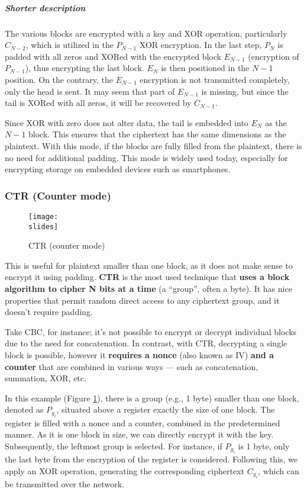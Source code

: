 \subparagraph{Shorter description}
The various blocks are encrypted with a key and XOR operation, particularly \(C_{N-2}\), which is utilized in the \(P_{N-1}\) XOR encryption.
In the last step, \(P_N\) is padded with all zeros and XORed with the encrypted block \(E_{N-1}\) (encryption of \( P_{N-1} \)), thus encrypting the last block.
\(E_N\) is then positioned in the \(N-1\) position. On the contrary, the \(E_{N-1}\) encryption is not transmitted completely, only the head is sent. It may seem that part of \(E_{N-1}\) is missing, but since the tail is XORed with all zeros, it will be recovered by \(C_{N-1}\).

Since XOR with zero does not alter data, the tail is embedded into \(E_N\) as the \(N-1\) block. This ensures that the ciphertext has the same dimensions as the plaintext. With this mode, if the blocks are fully filled from the plaintext, there is no need for additional padding. This mode is widely used today, especially for encrypting storage on embedded devices such as smartphones.


\subsubsection{CTR (Counter mode)}
\begin{figure}[h]
    \centering
    \texttt{[image: \\slides]}
    \caption{CTR (counter mode)}
    \label{fig:CTR}
\end{figure}
This is useful for plaintext smaller than one block, as it does not make sense to encrypt it using padding. \textbf{CTR} is the most used technique that \textbf{uses a block algorithm to cipher N bits at a time} (a “group”, often a byte). It has nice properties that permit random direct access to any ciphertext group, and it doesn't require padding.

Take CBC, for instance; it's not possible to encrypt or decrypt individual blocks due to the need for concatenation. In contrast, with CTR, decrypting a single block is possible, however it \textbf{requires a nonce} (also known as IV) \textbf{and a counter} that are combined in various ways — such as concatenation, summation, XOR, etc.

In this example (Figure \ref{fig:CTR}), there is a group (e.g., 1 byte) smaller than one block, denoted as $P_{g_i}$, situated above a register exactly the size of one block.
The register is filled with a nonce and a counter, combined in the predetermined manner.
As it is one block in size, we can directly encrypt it with the key. Subsequently, the leftmost group is selected. For instance, if
$P_{g_i}$ is 1 byte, only the last byte from the encryption of the register is considered.
Following this, we apply an XOR operation, generating the corresponding ciphertext $C_{g_i}$, which can be transmitted over the network.

